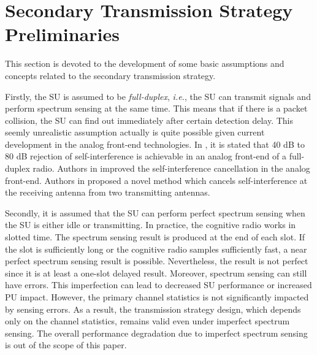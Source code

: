 \documentclass[10pt,final,journal,letterpaper]{IEEEtran}
\newcommand{\ie}{\emph{i.e.}, }
\begin{document}
\section{Secondary Transmission Strategy Preliminaries}\label{sec:3}
This section is devoted to the development of some basic assumptions and concepts related to the secondary transmission strategy.

\par
Firstly, the SU is assumed to be \emph{full-duplex}, \ie the SU can transmit signals and perform spectrum sensing at the same time. This means that if there is a packet collision, the SU can find out immediately after certain detection delay. This seemly unrealistic assumption actually is quite possible given current development in the analog front-end technologies. In \cite{duarte2010full}, it is stated that 40 dB to 80 dB rejection of self-interference is achievable in an analog front-end of a full-duplex radio. Authors in \cite{ahmed2012simultaneous, duarte2012design} improved the self-interference cancellation in the analog front-end. Authors in \cite{choi2010achieving} proposed a novel method which cancels self-interference at the receiving antenna from two transmitting antennas.

\par
Secondly, it is assumed that the SU can perform perfect spectrum sensing when the SU is either idle or transmitting. In practice, the cognitive radio works in slotted time. The spectrum sensing result is produced at the end of each slot. If the slot is sufficiently long or the cognitive radio samples sufficiently fast, a near perfect spectrum sensing result is possible. Nevertheless, the result is not perfect since it is at least a one-slot delayed result. Moreover, spectrum sensing can still have errors. This imperfection can lead to decreased SU performance or increased PU impact. However, the primary channel statistics is not significantly impacted by sensing errors. As a result, the transmission strategy design, which depends only on the channel statistics, remains valid even under imperfect spectrum sensing. The overall performance degradation due to imperfect spectrum sensing is out of the scope of this paper.
\end{document}
